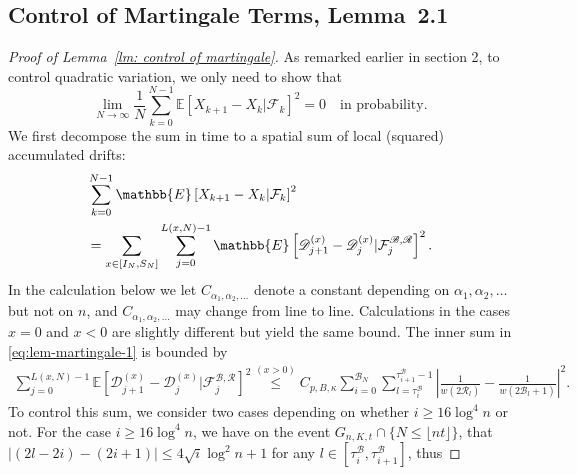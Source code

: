 \documentclass[EJP]{ejpecp} %
\begin{document}
\subsection{Control of Martingale Terms, Lemma~2.1} 
\begin{proof}[Proof of Lemma~\ref{lm: control of martingale}]
	As remarked earlier in section 2, to control quadratic variation, we only need to show that
	\[
	\lim_{N \to \infty } \frac{1}{N} \sum_{k = 0}^{N-1} \mathbb{E}\left[ X_{k+1} - X_k | \mathcal{F}_k \right]^2 = 0
	\quad \text{in probability}
	.\] 
	We first decompose the sum in time to a spatial sum of local (squared) accumulated drifts:
	\begin{align}
		&\sum_{k = 0}^{N-1} \mathbb{E}\left[ X_{k+1} - X_k | \mathcal{F}_k \right]^2
		\notag
		\\
		&= \sum_{x \in \left[ I_N, S_N \right]} \sum_{j = 0}^{L(x, N) - 1} \mathbb{E}\left[ \mathscr{D}_{j+1}^{(x)} - \mathscr{D}_j^{(x)} | \mathcal{F}_{j}^{\mathscr{B}, \mathscr{R}} \right]^2  
		\label{eq:lem-martingale-1}
		.\end{align}
	In the calculation below we let $C_{\alpha_1, \alpha_2, \dots}$ denote a constant depending on  $\alpha_1, \alpha_2, \dots$ but not on $n$, and $C_{\alpha_1, \alpha_2, \dots}$ may change from line to line. Calculations in the cases
	$x = 0$ and $x < 0$ are slightly different but yield the same bound.
	The inner sum in \eqref{eq:lem-martingale-1} is bounded by
	\begin{align*}
		\sum_{j =0}^{ L(x, N) - 1} \mathbb{E}\left[ \mathscr{D}_{j+1}^{(x)} - \mathscr{D}_j^{(x)} | \mathcal{F}_{j}^{\mathscr{B}, \mathscr{R}} \right]^2 \stackrel{(x > 0)}{\le} C_{p, B, \kappa} \sum_{i = 0}^{\mathscr{B}_N} \sum_{l = \tau_i^{\mathscr{B}}}^{\tau_{i+1}^{\mathscr{B}}-1}
		\left| \frac{1}{w(2 \mathscr{R}_l)} - \frac{1}{w\left( 2 \mathscr{B}_l + 1 \right) } \right|^2 
		.
	\end{align*}
	To control this sum, we consider two cases depending on whether $i \ge 16 \log^4 n$ or not. For the case $i \ge 16 \log^4 n$, we have on the event $G_{n, K, t}\cap \{N \le \lfloor nt \rfloor\}$, that $|(2 l - 2 i) - (2 i + 1)| \leq 4 \sqrt{i} \log^2 n + 1$ for any $l \in [\tau_i^\mathscr{B}, \tau_{i+1}^\mathscr{B}]$, thus

\end{proof}
\end{document}
